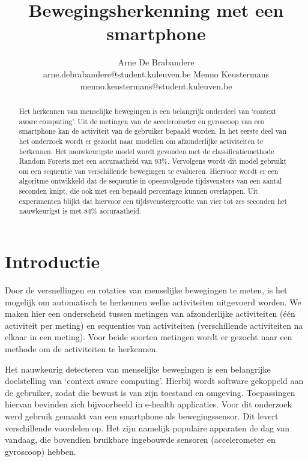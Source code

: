 \documentclass{article}
\title{Bewegingsherkenning met een smartphone}
\author{Arne De Brabandere\\
	arne.debrabandere@student.kuleuven.be
    \And
    Menno Keustermans\\
    menno.keustermans@student.kuleuven.be}
\begin{document}
\maketitle
\raggedbottom
\begin{abstract}

Het herkennen van menselijke bewegingen is een belangrijk onderdeel van `context aware computing'. Uit de metingen van de accelerometer en gyroscoop van een smartphone kan de activiteit van de gebruiker bepaald worden. In het eerste deel van het onderzoek wordt er gezocht naar modellen om afzonderlijke activiteiten te herkennen. Het nauwkeurigste model wordt gevonden met de classificatiemethode Random Forests met een accuraatheid van 93\%. Vervolgens wordt dit model gebruikt om een sequentie van verschillende bewegingen te evalueren. Hiervoor wordt er een algoritme ontwikkeld dat de sequentie in opeenvolgende tijdsvensters van een aantal seconden knipt, die ook met een bepaald percentage kunnen overlappen. Uit experimenten blijkt dat hiervoor een tijdsvenstergrootte van vier tot zes seconden
het nauwkeurigst is met 84\% accuraatheid.

\end{abstract}

\section{Introductie}

Door de versnellingen en rotaties van menselijke bewegingen te meten, is het mogelijk om automatisch te herkennen welke activiteiten uitgevoerd worden. We maken hier een onderscheid tussen metingen van afzonderlijke activiteiten (\'e\'en activiteit per meting) en sequenties van activiteiten (verschillende activiteiten na elkaar in een meting). Voor beide soorten metingen wordt er gezocht naar een methode om de activiteiten te herkennen.

Het nauwkeurig detecteren van menselijke bewegingen is een belangrijke doelstelling van `context aware computing'. Hierbij wordt software gekoppeld aan de gebruiker, zodat die bewust is van zijn toestand en omgeving. Toepassingen hiervan bevinden zich bijvoorbeeld in e-health applicaties. Voor dit onderzoek werd gebruik gemaakt van een smartphone als bewegingssensor. Dit levert verschillende voordelen op. Het zijn namelijk populaire apparaten de dag van vandaag, die bovendien bruikbare ingebouwde sensoren (accelerometer en gyroscoop) hebben.
\end{document}

